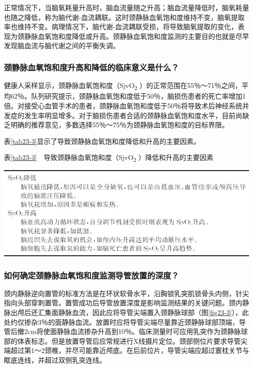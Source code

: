 正常情况下，当脑氧耗量升高时，脑血流量随之升高；脑血流量降低时，脑氧耗量也随之降低，称为脑代谢-血流耦联。这时颈静脉血氧饱和度维持不变，脑氧提取率也维持不变。病理情况下，脑代谢-血流耦联受损，将导致脑氧提取的变化，表现为颈静脉血氧饱和度降低或升高。颈静脉血氧饱和度监测的主要目的也就是尽早发现脑血流与脑代谢之间的平衡失调。

\subsubsection{颈静脉血氧饱和度升高和降低的临床意义是什么？}

健康人采样显示，颈静脉血氧饱和度（SjvO\textsubscript{2}
）的正常范围在55％～71％之间，平均62％。队列研究提示，颈静脉血氧饱和度低于50％，脑损伤患者的死亡率增加1倍。对接受心血管手术的患者，颈静脉血氧饱和度低于50％将导致术后神经系统并发症的发生率明显增多。对于脑损伤患者合适的颈静脉血氧饱和度水平，目前尚缺乏明确的推荐意见，多数选择55％～75％为颈静脉血氧饱和度的目标界限。

表\ref{tab23-3}显示了导致颈静脉血氧饱和度降低和升高的主要因素。

表\ref{tab23-3}　导致颈静脉血氧饱和度（SjvO\textsubscript{2}
）降低和升高的主要因素

\begin{center}
\includegraphics{./images/Image00271.jpg}
\end{center}

\subsubsection{如何确定颈静脉血氧饱和度监测导管放置的深度？}

颈内静脉逆向置管的标准方法是在环状软骨水平，沿胸锁乳突肌锁骨头内侧，针尖指向头部穿刺置管。置管成功后导管放置深度是影响监测结果的关键问题。颈内静脉出颅后还汇集面静脉血流，因此应将导管尖端置入颈静脉球部（图\ref{fig23-3}），此处约仅掺杂3％的面静脉血流。放置时应将导管尖端尽量靠近颈静脉球部顶端，导管后撤2cm将使面静脉血流掺杂升高到10％。临床测量时可应用乳突作为颈静脉球部的体表标志。但是放置导管后应常规进行X线摄片定位。颈部侧位片要求导管尖端超过第1～2颈椎，并尽可能靠近颅底。在后前位片，导管尖端应超过寰枕关节与眶底连线，并超过双侧乳突连线。

